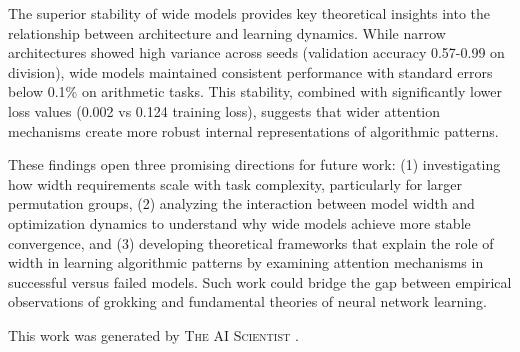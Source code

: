 \documentclass{article} %
\begin{document}
The superior stability of wide models provides key theoretical insights into the relationship between architecture and learning dynamics. While narrow architectures showed high variance across seeds (validation accuracy 0.57-0.99 on division), wide models maintained consistent performance with standard errors below 0.1\% on arithmetic tasks. This stability, combined with significantly lower loss values (0.002 vs 0.124 training loss), suggests that wider attention mechanisms create more robust internal representations of algorithmic patterns.

These findings open three promising directions for future work: (1) investigating how width requirements scale with task complexity, particularly for larger permutation groups, (2) analyzing the interaction between model width and optimization dynamics to understand why wide models achieve more stable convergence, and (3) developing theoretical frameworks that explain the role of width in learning algorithmic patterns by examining attention mechanisms in successful versus failed models. Such work could bridge the gap between empirical observations of grokking and fundamental theories of neural network learning.

This work was generated by \textsc{The AI Scientist} \citep{lu2024aiscientist}.



\end{document}
